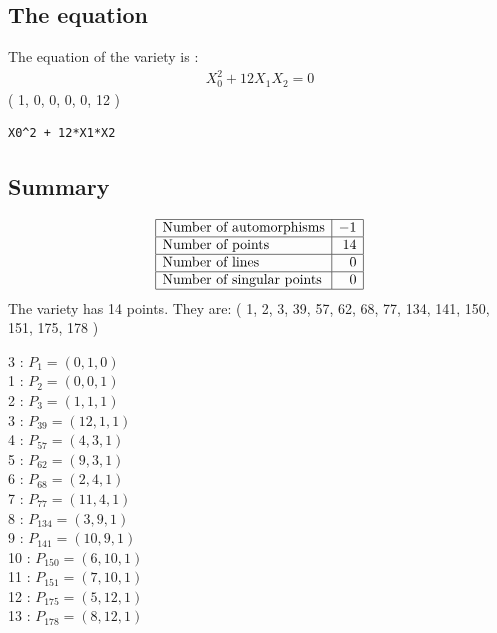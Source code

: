 

\subsection*{The equation}
The equation of the variety  is :
{\renewcommand{\arraystretch}{1.5}
$$
\begin{array}{c}
X_0^2 + 12X_1X_2=0
\end{array}
$$}
( 1, 0, 0, 0, 0, 12 )\\
\begin{verbatim}
X0^2 + 12*X1*X2
\end{verbatim}
\subsection*{Summary}
{\renewcommand{\arraystretch}{1.5}
$$
\begin{array}{|l|r|}
\hline
\mbox{Number of automorphisms} & -1\\
\hline
\mbox{Number of points} & 14\\
\hline
\mbox{Number of lines} & 0 \\
\hline
\mbox{Number of singular points} & 0\\
\hline
\end{array}
$$}
The variety has 14 points. They are: 
( 1, 2, 3, 39, 57, 62, 68, 77, 134, 141, 150, 151, 175, 178 )\\
\begin{multicols}{3}
 : $P_{1}=( 0, 1, 0 )$\\
1 : $P_{2}=( 0, 0, 1 )$\\
2 : $P_{3}=( 1, 1, 1 )$\\
3 : $P_{39}=( 12, 1, 1 )$\\
4 : $P_{57}=( 4, 3, 1 )$\\
5 : $P_{62}=( 9, 3, 1 )$\\
6 : $P_{68}=( 2, 4, 1 )$\\
7 : $P_{77}=( 11, 4, 1 )$\\
8 : $P_{134}=( 3, 9, 1 )$\\
9 : $P_{141}=( 10, 9, 1 )$\\
10 : $P_{150}=( 6, 10, 1 )$\\
11 : $P_{151}=( 7, 10, 1 )$\\
12 : $P_{175}=( 5, 12, 1 )$\\
13 : $P_{178}=( 8, 12, 1 )$\\
\end{multicols}

